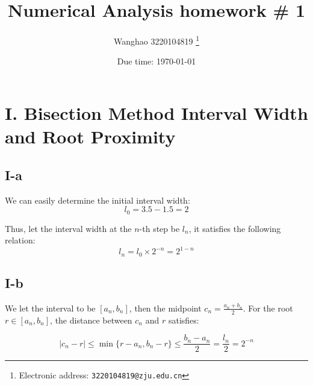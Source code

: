 \documentclass[a4paper]{article}
\begin{document}
\title{Numerical Analysis homework \# 1}

\author{Wanghao 3220104819
  \thanks{Electronic address: \texttt{3220104819@zju.edu.cn}}}


\date{Due time: \today}

\maketitle



\section*{I. Bisection Method Interval Width and Root Proximity}

\subsection*{I-a}

We can easily determine the initial interval width:
\begin{equation}
  l_0 = 3.5 - 1.5 = 2
\end{equation}

Thus, let the interval width at the $n$-th step be $l_n$, it satisfies the following relation:
\begin{equation}
  l_n = l_0 \times 2^{-n} = 2^{1-n}
\end{equation}


\subsection*{I-b}
\label{subsection:1-b}

We let the interval to be $[a_n, b_n]$, then the midpoint $c_n = \frac{a_n + b_n}{2}$. For the root $r \in [a_n, b_n]$, the distance between $c_n$ and $r$ satisfies:

\begin{equation}
  \vert c_n - r \vert \leq \min \{r-a_n, b_n-r\} \leq \frac{b_n - a_n}{2} = \frac{l_n}{2} = 2^{-n}
\end{equation}
\end{document}
